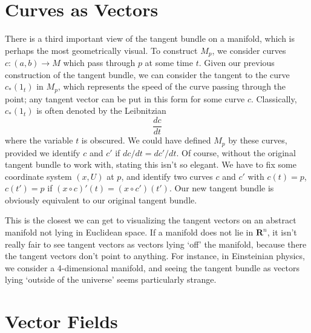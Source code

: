 \section{Curves as Vectors}

There is a third important view of the tangent bundle on a manifold, which is perhaps the most geometrically visual. To construct $M_p$, we consider curves $c: (a,b) \to M$ which pass through $p$ at some time $t$. Given our previous construction of the tangent bundle, we can consider the tangent to the curve $c_*(1_t)$ in $M_p$, which represents the speed of the curve passing through the point; any tangent vector can be put in this form for some curve $c$. Classically, $c_*(1_t)$ is often denoted by the Leibnitzian
%
\[ \frac{dc}{dt} \]
%
where the variable $t$ is obscured. We could have defined $M_p$ by these curves, provided we identify $c$ and $c'$ if $dc/dt = dc'/dt$. Of course, without the original tangent bundle to work with, stating this isn't so elegant. We have to fix some coordinate system $(x,U)$ at $p$, and identify two curves $c$ and $c'$ with $c(t) = p$, $c(t') = p$ if $(x \circ c)'(t) = (x \circ c')(t')$. Our new tangent bundle is obviously equivalent to our original tangent bundle.

This is the closest we can get to visualizing the tangent vectors on an abstract manifold not lying in Euclidean space. If a manifold does not lie in $\mathbf{R}^n$, it isn't really fair to see tangent vectors as vectors lying `off' the manifold, because there the tangent vectors don't point to anything. For instance, in Einsteinian physics, we consider a 4-dimensional manifold, and seeing the tangent bundle as vectors lying `outside of the universe' seems particularly strange.

\section{Vector Fields}

